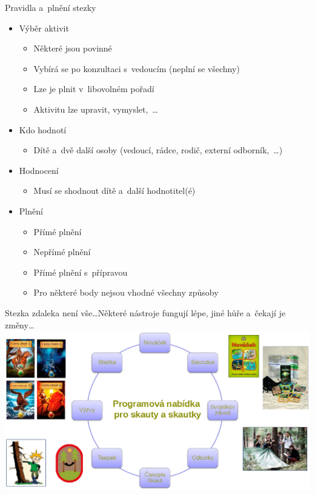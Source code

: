 \documentclass[compress, ucs, xelatex, xcolor=dvipsnames, print,
  hyperref={
    bookmarks=true,
    unicode=true,
    colorlinks=true,
    plainpages=false,
    pdfkeywords={Junak, Pedagogika, Skaut, Skauting, Vychovna metoda},
    linkcolor=Black,
    anchorcolor=Black,
    citecolor=OliveGreen,
    filecolor=OliveGreen,
    menucolor=Black,
    urlcolor=OliveGreen,
    pdftex}
  ]{beamer}
\begin{document}
\begin{frame}{Pravidla a~plnění stezky}
  \begin{itemize}
    \item Výběr aktivit
    \begin{itemize}
      \item Některé jsou povinné
      \item Vybírá se po konzultaci s~vedoucím (neplní se všechny)
      \item Lze je plnit v~libovolném pořadí
      \item Aktivitu lze upravit, vymyslet,~\ldots
    \end{itemize}
    \item Kdo hodnotí
    \begin{itemize}
      \item Dítě a~dvě další osoby (vedoucí, rádce, rodič, externí odborník,~\ldots)
    \end{itemize}
    \item Hodnocení
    \begin{itemize}
      \item Musí se shodnout dítě a~další hodnotitel(é)
    \end{itemize}
    \item Plnění
    \begin{itemize}
      \item Přímé plnění
      \item Nepřímé plnění
      \item Přímé plnění s~přípravou
      \item Pro některé body nejsou vhodné všechny způsoby
    \end{itemize}
  \end{itemize}
\end{frame}

\begin{frame}{Stezka zdaleka není vše\ldots}{Některé nástroje fungují lépe, jiné hůře a~čekají je změny\ldots}
  \includegraphics[width=\textwidth]{komplet.png}
\end{frame}
\end{document}
